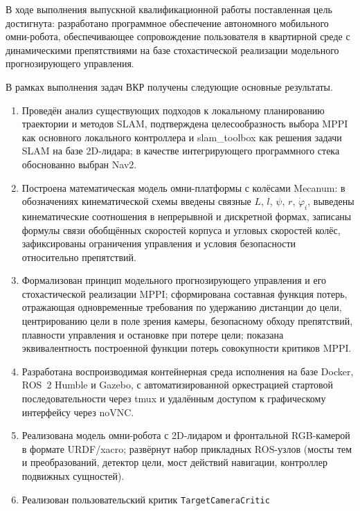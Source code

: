 
В ходе выполнения выпускной квалификационной работы поставленная цель
достигнута: разработано программное обеспечение автономного мобильного
омни-робота, обеспечивающее сопровождение пользователя в квартирной
среде с динамическими препятствиями на базе стохастической реализации
модельного прогнозирующего управления.

В рамках выполнения задач ВКР получены следующие основные результаты.
\begin{enumerate}
    \item Проведён анализ существующих подходов к локальному планированию
          траектории и методов SLAM, подтверждена целесообразность выбора
          MPPI как основного локального контроллера и slam\_toolbox как
          решения задачи SLAM на базе 2D-лидара; в качестве
          интегрирующего программного стека обоснованно выбран Nav2.
    \item Построена математическая модель омни-платформы с колёсами
          Mecanum: в обозначениях кинематической схемы введены связные
          $L$, $l$, $\psi$, $r$, $\dot{\varphi}_i$, выведены
          кинематические соотношения в непрерывной и дискретной формах,
          записаны формулы связи обобщённых скоростей корпуса и угловых
          скоростей колёс, зафиксированы ограничения управления и
          условия безопасности относительно препятствий.
    \item Формализован принцип модельного прогнозирующего управления и
          его стохастической реализации MPPI; сформирована составная
          функция потерь, отражающая одновременные требования по
          удержанию дистанции до цели, центрированию цели в поле зрения
          камеры, безопасному обходу препятствий, плавности управления и
          остановке при потере цели; показана эквивалентность
          построенной функции потерь совокупности критиков MPPI.
    \item Разработана воспроизводимая контейнерная среда исполнения на
          базе Docker, ROS~2 Humble и Gazebo, с автоматизированной
          оркестрацией стартовой последовательности через tmux и
          удалённым доступом к графическому интерфейсу через noVNC.
    \item Реализована модель омни-робота с 2D-лидаром и фронтальной
          RGB-камерой в формате URDF/xacro; развёрнут набор прикладных
          ROS-узлов (мосты тем и преобразований, детектор цели, мост
          действий навигации, контроллер подвижных сущностей).
    \item Реализован пользовательский критик \texttt{TargetCameraCritic}

\end{enumerate}
